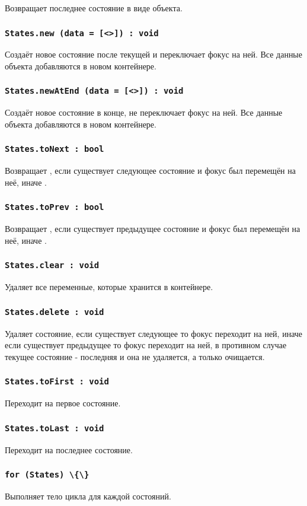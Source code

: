Возвращает последнее состояние в виде объекта.

\subsubsection{\lstinline|States.new (data = [<>]) : void|}

Создаёт новое состояние после текущей и переключает фокус на ней. Все данные объекта  добавляются в новом контейнере.

\subsubsection{\lstinline|States.newAtEnd (data = [<>]) : void|}

Создаёт новое состояние в конце, не переключает фокус на ней. Все данные объекта  добавляются в новом контейнере.

\subsubsection{\lstinline|States.toNext : bool|}

Возвращает \true, если существует следующее состояние и фокус был перемещён на неё, иначе \false.

\subsubsection{\lstinline|States.toPrev : bool|}

Возвращает \true, если существует предыдущее состояние и фокус был перемещён на неё, иначе \false.

\subsubsection{\lstinline|States.clear : void|}

Удаляет все переменные, которые хранится в контейнере.

\subsubsection{\lstinline|States.delete : void|}

Удаляет состояние, если существует следующее то фокус переходит на ней, иначе если существует предыдущее то фокус переходит на ней, в противном случае текущее состояние - последняя и она не удаляется, а только очищается.

\subsubsection{\lstinline|States.toFirst : void|}

Переходит на первое состояние.

\subsubsection{\lstinline|States.toLast : void|}

Переходит на последнее состояние.

\subsubsection{\lstinline|for (States) \{\}|}

Выполняет тело цикла для каждой состояний.

